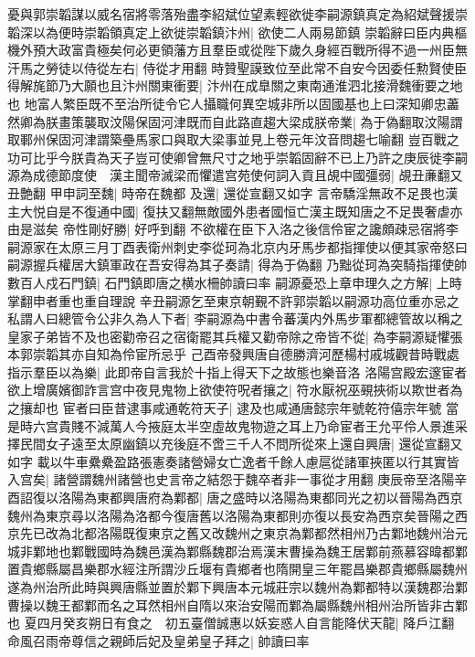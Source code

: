 憂與郭崇韜謀以威名宿將零落殆盡李紹斌位望素輕欲徙李嗣源鎮真定為紹斌聲援崇韜深以為便時崇韜領真定上欲徙崇韜鎮汴州|{
	欲使二人兩易節鎮}
崇韜辭曰臣内典樞機外預大政富貴極矣何必更領藩方且羣臣或從陛下歲久身經百戰所得不過一州臣無汗馬之勞徒以侍從左右|{
	侍從才用翻}
時贊聖謨致位至此常不自安今因委任勲賢使臣得解旄節乃大願也且汴州關東衝要|{
	汴州在成臯關之東南通淮泗北接滑魏衝要之地也}
地富人繁臣既不至治所徒令它人攝職何異空城非所以固國基也上曰深知卿忠藎然卿為朕畫策襲取汶陽保固河津既而自此路直趨大梁成朕帝業|{
	為于偽翻取汶陽謂取鄆州保固河津謂築壘馬家口與取大梁事並見上卷元年汶音問趨七喻翻}
豈百戰之功可比乎今朕貴為天子豈可使卿曾無尺寸之地乎崇韜固辭不已上乃許之庚辰徙李嗣源為成德節度使　漢主聞帝滅梁而懼遣宫苑使何詞入貢且覘中國彊弱|{
	覘丑亷翻又丑艶翻}
甲申詞至魏|{
	時帝在魏都}
及還|{
	還從宣翻又如字}
言帝驕淫無政不足畏也漢主大悦自是不復通中國|{
	復扶又翻無敵國外患者國恒亡漢主既知唐之不足畏奢虐亦由是滋矣}
帝性剛好勝|{
	好呼到翻}
不欲權在臣下入洛之後信伶宦之讒頗疎忌宿將李嗣源家在太原三月丁酉表衛州刺史李從珂為北京内牙馬步都指揮使以便其家帝怒曰嗣源握兵權居大鎮軍政在吾安得為其子奏請|{
	得為于偽翻}
乃黜從珂為突騎指揮使帥數百人戍石門鎮|{
	石門鎮即唐之横水柵帥讀曰率}
嗣源憂恐上章申理久之方解|{
	上時掌翻申者重也重自理說}
辛丑嗣源乞至東京朝覲不許郭崇韜以嗣源功高位重亦忌之私謂人曰總管令公非久為人下者|{
	李嗣源為中書令蕃漢内外馬步軍都總管故以稱之}
皇家子弟皆不及也密勸帝召之宿衛罷其兵權又勸帝除之帝皆不從|{
	為李嗣源疑懼張本郭崇韜其亦自知為伶宦所忌乎}
己酉帝發興唐自德勝濟河歷楊村戚城觀昔時戰處指示羣臣以為樂|{
	此即帝自言我於十指上得天下之故態也樂音洛}
洛陽宫殿宏邃宦者欲上增廣嬪御詐言宫中夜見鬼物上欲使符呪者攘之|{
	符水厭祝巫覡挾術以欺世者為之攘却也}
宦者曰臣昔逮事咸通乾符天子|{
	逮及也咸通唐懿宗年號乾符僖宗年號}
當是時六宫貴賤不減萬人今掖庭太半空虛故鬼物遊之耳上乃命宦者王允平伶人景進采擇民間女子遠至太原幽鎮以充後庭不啻三千人不問所從來上還自興唐|{
	還從宣翻又如字}
載以牛車纍纍盈路張憲奏諸營婦女亡逸者千餘人慮扈從諸軍挾匿以行其實皆入宫矣|{
	諸營謂魏州諸營也史言帝之結怨于魏卒者非一事從才用翻}
庚辰帝至洛陽辛酉詔復以洛陽為東都興唐府為鄴都|{
	唐之盛時以洛陽為東都同光之初以晉陽為西京魏州為東京尋以洛陽為洛都今復唐舊以洛陽為東都則亦復以長安為西京矣晉陽之西京先已改為北都洛陽既復東京之舊又改魏州之東京為鄴都然相州乃古鄴地魏州治元城非鄴地也鄴戰國時為魏邑漢為鄴縣魏郡治焉漢末曹操為魏王居鄴前燕慕容暐都鄴置貴鄉縣屬昌樂郡水經注所謂沙丘堰有貴鄉者也隋開皇三年罷昌樂郡貴鄉縣屬魏州遂為州治所此時與興唐縣並置於鄴下興唐本元城莊宗以魏州為鄴都特以漢魏郡治鄴曹操以魏王都鄴而名之耳然相州自隋以來治安陽而鄴為屬縣魏州相州治所皆非古鄴也}
夏四月癸亥朔日有食之　初五臺僧誠惠以妖妄惑人自言能降伏天龍|{
	降戶江翻}
命風召雨帝尊信之親師后妃及皇弟皇子拜之|{
	帥讀曰率}
